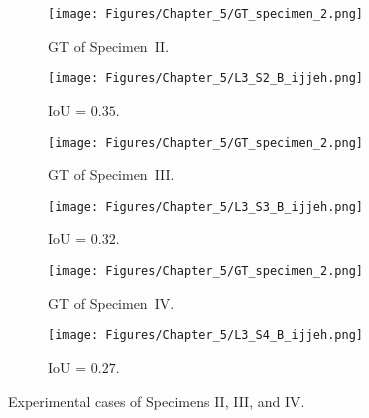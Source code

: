 \begin{figure} [!h]
	\centering
	\begin{subfigure}[b]{0.47\textwidth}
		\centering
		\texttt{[image: Figures/Chapter\_5/GT\_specimen\_2.png]}
		\caption{GT of Specimen~II.}
		\label{fig:GT_specimen_2}
	\end{subfigure}
	\hfill
	\begin{subfigure}[b]{0.47\textwidth}
		\centering
		\texttt{[image: Figures/Chapter\_5/L3\_S2\_B\_ijjeh.png]}
		\caption{IoU = \(0.35\).} 
		\label{fig:L3_S2_B_ijjeh}
	\end{subfigure}
	\par\medskip
	\begin{subfigure}[b]{0.47\textwidth}
		\centering
		\texttt{[image: Figures/Chapter\_5/GT\_specimen\_2.png]}
		\caption{GT of Specimen~III.}
		\label{fig:GT_specimen_3}
	\end{subfigure}
	\hfill
	\begin{subfigure}[b]{0.47\textwidth}
		\centering
		\texttt{[image: Figures/Chapter\_5/L3\_S3\_B\_ijjeh.png]}
		\caption{IoU = \(0.32\).} 
		\label{fig:L3_S3_B_ijjeh}
	\end{subfigure}
	\par\medskip
	\begin{subfigure}[b]{0.47\textwidth}
		\centering
		\texttt{[image: Figures/Chapter\_5/GT\_specimen\_2.png]}
		\caption{GT of Specimen~IV.}
		\label{fig:gt_specimen_4}
	\end{subfigure}
	\hfill
	\begin{subfigure}[b]{0.47\textwidth}
		\centering
		\texttt{[image: Figures/Chapter\_5/L3\_S4\_B\_ijjeh.png]}
		\caption{IoU = \(0.27\).} 
		\label{fig:L3_S4_B_ijjeh}
	\end{subfigure}
	\caption{Experimental cases of Specimens II, III, and IV.}
	\label{fig:exp_case}
\end{figure} 

